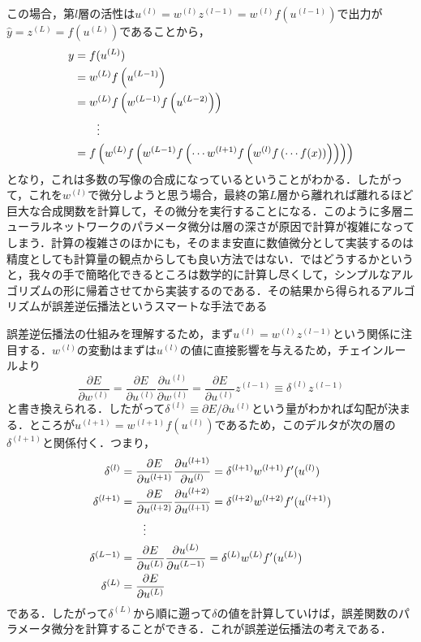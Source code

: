 \documentclass[a4paper,11pt]{jsreport}
\begin{document}
この場合，第$l$層の活性は$u^{(l)} = w^{(l)} z^{(l-1)} = w^{(l)}  f(u^{(l-1)})$で出力が$\hat{y} = z^{(L)} = f(u^{(L)})$であることから，
\begin{align}
  y
  &= f(u^{(L)}) \notag \\
  &= w^{(L)} f\left(u^{(L-1)} \right) \notag \\
  &= w^{(L)} f\left(w^{(L-1)} f\left(u^{(L-2)} \right) \right) \notag \\
  & \qquad \vdots \notag \\
  &= f\left( w^{(L)} f\left(w^{(L-1)} f\left( \cdots w^{(l+1)} f\left(w^{(l)} f\left(\cdots f(x)\right)\right)\right)\right)\right)
\end{align}
となり，これは多数の写像の合成になっているということがわかる．したがって，これを$w^{(l)}$で微分しようと思う場合，最終の第$L$層から離れれば離れるほど巨大な合成関数を計算して，その微分を実行することになる．このように多層ニューラルネットワークのパラメータ微分は層の深さが原因で計算が複雑になってしまう．計算の複雑さのほかにも，そのまま安直に数値微分として実装するのは精度としても計算量の観点からしても良い方法ではない．ではどうするかというと，我々の手で簡略化できるところは数学的に計算し尽くして，シンプルなアルゴリズムの形に帰着させてから実装するのである．その結果から得られるアルゴリズムが誤差逆伝播法というスマートな手法である\par
誤差逆伝播法の仕組みを理解するため，まず$u^{(l)} = w^{(l)} z^{(l-1)}$という関係に注目する．$w^{(l)}$の変動はまずは$u^{(l)}$の値に直接影響を与えるため，チェインルールより
\begin{equation}
  \frac{\partial E}{\partial w^{(l)}}
  = \frac{\partial E}{\partial u^{(l)}} \frac{\partial u^{(l)}}{\partial w^{(l)}}
  = \frac{\partial E}{\partial u^{(l)}} z^{(l-1)}
  \equiv \delta^{(l)} z^{(l-1)}
\end{equation}
と書き換えられる．したがって$\delta^{(l)} \equiv \partial E / \partial u^{(l)}$という量がわかれば勾配が決まる．ところが$u^{(l+1)} = w^{(l+1)} f(u^{(l)})$であるため，このデルタが次の層の$\delta^{(l+1)}$と関係付く．つまり，
\begin{align}
  \delta^{(l)}
  &= \frac{\partial E}{\partial u^{(l+1)}} \frac{\partial u^{(l+1)}}{\partial u^{(l)}}
  = \delta^{(l+1)} w^{(l+1)} f'(u^{(l)}) \notag \\
  \delta^{(l+1)}
  &= \frac{\partial E}{\partial u^{(l+2)}} \frac{\partial u^{(l+2)}}{\partial u^{(l+1)}}
  = \delta^{(l+2)} w^{(l+2)} f'(u^{(l+1)}) \notag \\
  & \qquad \vdots \notag \\
  \delta^{(L-1)}
  &= \frac{\partial E}{\partial u^{(L)}} \frac{\partial u^{(L)}}{\partial u^{(L-1)}}
  = \delta^{(L)} w^{(L)} f'(u^{(L)}) \notag \\
  \delta^{(L)}
  &= \frac{\partial E}{\partial u^{(L)}}
\end{align}
である．したがって$\delta^{(L)}$から順に遡って$\delta$の値を計算していけば，誤差関数のパラメータ微分を計算することができる．これが誤差逆伝播法の考えである．
\end{document}
